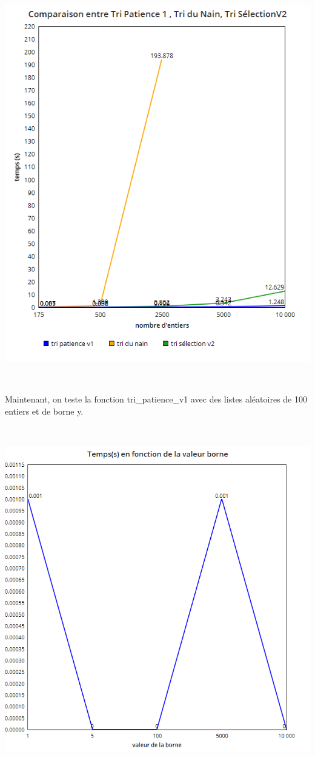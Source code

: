 \documentclass[a4paper, 12pt]{article}
\begin{document}
\begin{center}
\includegraphics[scale=0.25]{tri_patience1-comparaisonN.png}
\end{center}
~

Maintenant, on teste la fonction tri\_patience\_v1 avec des listes aléatoires de 100 entiers et de borne y.

~


\begin{center}
\includegraphics[scale=0.25]{tripat1B.png}
\end{center}
~
\end{document}
